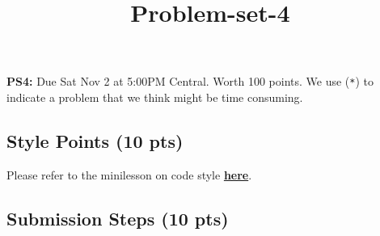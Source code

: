 \documentclass[
  letterpaper,
  DIV=11,
  numbers=noendperiod]{scrartcl}
\title{Problem-set-4}
\author{}
\date{}
\begin{document}
\maketitle



\textbf{PS4:} Due Sat Nov 2 at 5:00PM Central. Worth 100 points. We use
(\texttt{*}) to indicate a problem that we think might be time
consuming.

\subsection{Style Points (10 pts)}\label{style-points-10-pts}

Please refer to the minilesson on code style
\textbf{\href{https://uchicago.zoom.us/rec/share/pG_wQ-pHTQrJTmqNn4rcrw5V194M2H2s-2jdy8oVhWHkd_yZt9o162IWurpA-fxU.BIQlSgZLRYctvzp-}{here}}.

\subsection{Submission Steps (10 pts)}\label{submission-steps-10-pts}
\end{document}
